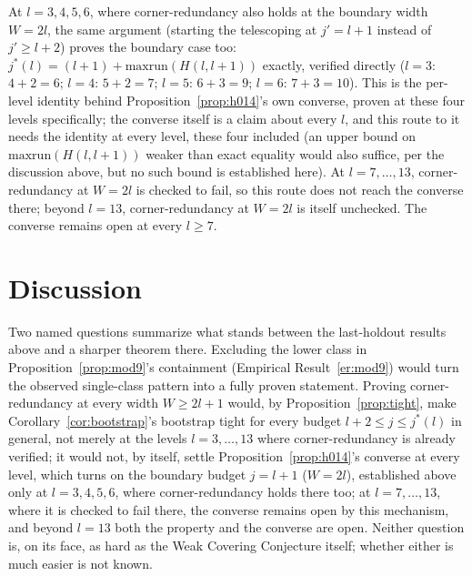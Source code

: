 \documentclass[11pt]{amsart}
\theoremstyle{plain}
\theoremstyle{definition}
\theoremstyle{remark}
\begin{document}
At $l=3,4,5,6$, where corner-redundancy also holds at the boundary width $W=2l$, the same argument
(starting the telescoping at $j'=l+1$ instead of $j'\ge l+2$) proves the boundary case too:
$j^*(l)=(l+1)+\mathrm{maxrun}(H(l,l+1))$ exactly, verified directly ($l=3$: $4+2=6$; $l=4$: $5+2=7$;
$l=5$: $6+3=9$; $l=6$: $7+3=10$). This is the per-level identity behind
Proposition~\ref{prop:h014}'s own converse, proven at these four levels specifically; the converse
itself is a claim about every $l$, and this route to it needs the identity at every level, these
four included (an upper bound on $\mathrm{maxrun}(H(l,l+1))$ weaker than exact equality would also
suffice, per the discussion above, but no such bound is established here). At
$l=7,\dots,13$, corner-redundancy at $W=2l$ is checked to fail, so
this route does not reach the converse there; beyond $l=13$, corner-redundancy at $W=2l$ is
itself unchecked. The converse remains open at every $l\ge7$.

\section{Discussion}
\label{sec:discussion}

Two named questions summarize what stands between the last-holdout results above and a sharper
theorem there.
Excluding the lower class in Proposition~\ref{prop:mod9}'s containment (Empirical
Result~\ref{er:mod9}) would turn the observed single-class pattern into a fully proven statement.
Proving corner-redundancy at every width $W\ge2l+1$ would, by Proposition~\ref{prop:tight}, make
Corollary~\ref{cor:bootstrap}'s bootstrap tight for every budget $l+2\le j\le j^*(l)$ in general, not
merely at the levels $l=3,\dots,13$ where corner-redundancy is already verified; it would not, by
itself, settle Proposition~\ref{prop:h014}'s converse at every level, which turns on the boundary
budget $j=l+1$ ($W=2l$), established above only at $l=3,4,5,6$, where corner-redundancy holds there
too; at $l=7,\dots,13$, where it is checked to fail there, the converse remains open by this
mechanism, and beyond $l=13$ both the property and the converse are open. Neither question is, on
its face, as hard as the Weak Covering Conjecture itself; whether either is much easier is not known.
\end{document}
